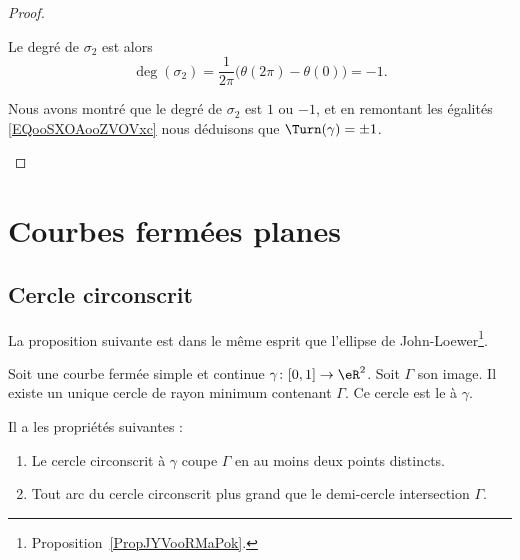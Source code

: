 \begin{proof}
\begin{subproof}
\begin{subproof}
			Le degré de \( \sigma_2\) est alors
			\begin{equation}
				\deg(\sigma_2)=\frac{1}{ 2\pi }\big( \theta(2\pi)-\theta(0) \big)=-1.
			\end{equation}

		\end{subproof}

		\spitem[Conclusion]

		Nous avons montré que le degré de \( \sigma_2\) est \( 1\) ou \( -1\), et en remontant les égalités \eqref{EQooSXOAooZVOVxc} nous déduisons que \( \Turn(\gamma)=\pm 1\).

	\end{subproof}
\end{proof}

\section{Courbes fermées planes}

\subsection{Cercle circonscrit}

La proposition suivante est dans le même esprit que l'ellipse de John-Loewer\footnote{Proposition~\ref{PropJYVooRMaPok}.}.
\begin{propositionDef}      \label{PROPDEFooCWESooVbDven}
	Soit une courbe fermée simple et continue \( \gamma\colon \mathopen[ 0 , 1 \mathclose]\to \eR^2\). Soit \( \Gamma\) son image. Il existe un unique cercle de rayon minimum contenant \( \Gamma\). Ce cercle est le  à \( \gamma\).

	Il a les propriétés suivantes :
	\begin{enumerate}
		\item
		      Le cercle circonscrit à \( \gamma\) coupe \( \Gamma\) en au moins deux points distincts.
		\item
		      Tout arc du cercle circonscrit plus grand que le demi-cercle intersection \( \Gamma\).
	\end{enumerate}
\end{propositionDef}

